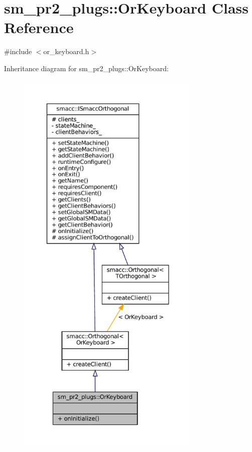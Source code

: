 \hypertarget{classsm__pr2__plugs_1_1OrKeyboard}{}\section{sm\+\_\+pr2\+\_\+plugs\+:\+:Or\+Keyboard Class Reference}
\label{classsm__pr2__plugs_1_1OrKeyboard}


{\ttfamily \#include $<$or\+\_\+keyboard.\+h$>$}



Inheritance diagram for sm\+\_\+pr2\+\_\+plugs\+:\+:Or\+Keyboard\+:
\nopagebreak
\begin{figure}[H]
\begin{center}
\leavevmode
\includegraphics[height=550pt]{classsm__pr2__plugs_1_1OrKeyboard__inherit__graph}
\end{center}
\end{figure}


